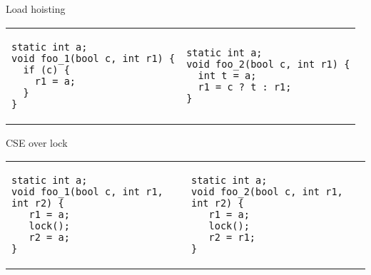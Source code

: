 \begin{frame}[t, fragile]{Load hoisting}

\begin{tabular}{p{} p{}}

\begin{verbatim}
static int a;
void foo_1(bool c, int r1) {
  if (c) {
    r1 = a;
  }
}
\end{verbatim}

&

\begin{verbatim}
static int a;
void foo_2(bool c, int r1) {
  int t = a;
  r1 = c ? t : r1;
}
\end{verbatim}
\end{tabular}

\end{frame}


\begin{frame}[t, fragile]{CSE over lock}

\begin{tabular}{p{} p{}}

\begin{verbatim}
static int a;
void foo_1(bool c, int r1, int r2) {
   r1 = a;
   lock();
   r2 = a; 
}
\end{verbatim}

&

\begin{verbatim}
static int a;
void foo_2(bool c, int r1, int r2) {
   r1 = a;
   lock();
   r2 = r1; 
}
\end{verbatim}
\end{tabular}

\end{frame}



